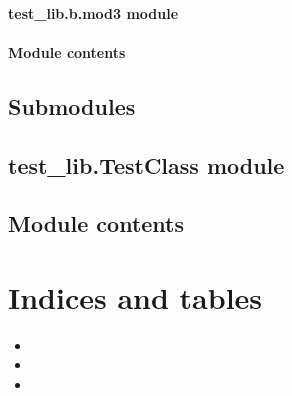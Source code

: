 \documentclass[letterpaper,10pt,dvipdfmx]{sphinxmanual}
\begin{document}
\subsubsection{test\_lib.b.mod3 module}
\label{\detokenize{test_lib.b:test-lib-b-mod3-module}}

\subsubsection{Module contents}
\label{\detokenize{test_lib.b:module-contents}}

\section{Submodules}
\label{\detokenize{test_lib:submodules}}

\section{test\_lib.TestClass module}
\label{\detokenize{test_lib:test-lib-testclass-module}}

\section{Module contents}
\label{\detokenize{test_lib:module-contents}}

\chapter{Indices and tables}
\label{\detokenize{index:indices-and-tables}}\begin{itemize}
\item {} 

\item {} 

\item {} 

\end{itemize}



\renewcommand{\indexname}{Index}
\printindex
\end{document}
